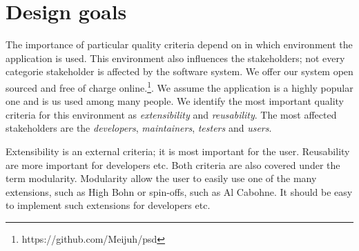 \section{Design goals}
The importance of particular quality criteria depend on in which environment the application is
used. This environment also influences the stakeholders; not every categorie stakeholder is affected
by the software system. We offer our system open sourced and free of charge
online.\footnote{https://github.com/Meijuh/psd}. We assume the application is a highly popular one
and is us used among many people. We identify the most important quality criteria for this
environment as \emph{extensibility} and \emph{reusability}. The most affected stakeholders are the
\emph{developers}, \emph{maintainers}, \emph{testers} and \emph{users}.

Extensibility is an external criteria; it is most important for the user. Reusability are more
important for developers etc. Both criteria are also covered under the term modularity. Modularity
allow the user to easily use one of the many extensions, such as High Bohn or spin-offs, such as Al
Cabohne. It should be easy to implement such extensions for developers etc.

